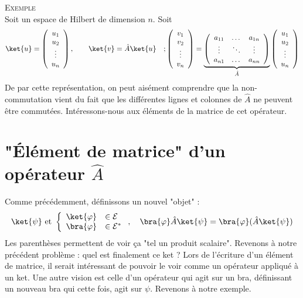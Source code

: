 \textsc{Exemple}\\
Soit un espace de Hilbert de dimension $n$. Soit
\begin{equation}
\ket{u} = \left(\begin{array}{c}
u_1\\
u_2\\
\vdots\\
u_n
\end{array}\right),\qquad \ket{v} = \hat{A}\ket{u}\quad ; \left(\begin{array}{c}
v_1\\
v_2\\
\vdots\\
v_n
\end{array}\right) = \underbrace{\left(\begin{array}{ccc}
a_{11} & \dots & a_{1n}\\
\vdots &\ddots &\vdots\\
a_{n1} & \dots & a_{nn}
\end{array}\right)}_{\hat{A}}\left(\begin{array}{c}
u_1\\
u_2\\
\vdots\\
u_n
\end{array}\right)
\end{equation}
De par cette représentation, on peut aisément comprendre que la non-commutation 
vient du fait que les différentes lignes et colonnes de $\hat{A}$ ne peuvent 
être commutées. Intéressons-nous aux éléments de la matrice de cet opérateur.



\section{"Élément de matrice" d'un opérateur $\hat{A}$}
Comme précédemment, définissons un nouvel "objet" :
\begin{equation}
\ket{\psi} \text{ et } \left\{\begin{array}{ll}
\ket{\varphi} &\in \mathcal{E}\\
\bra{\varphi} &\in \mathcal{E}^*
\end{array}\right., \quad \bra{\varphi}\hat{A}\ket{\psi} = \bra{\varphi}(
\hat{A}\ket{\psi})
\end{equation}
Les parenthèses permettent de voir ça "tel un produit scalaire". Revenons 
à notre précédent problème : quel est finalement ce ket ? Lors de l'écriture 
d'un élément de matrice, il serait intéressant de pouvoir le voir comme un 
opérateur appliqué à un ket. Une autre vision est celle d'un opérateur 
qui agit sur un bra, définissant un nouveau bra qui cette fois, agit sur 
$\psi$. Revenons à notre exemple.

